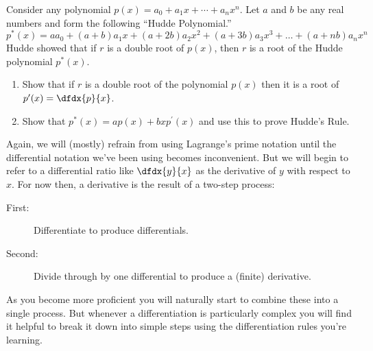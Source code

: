   \begin{embeddedproblem} Consider any polynomial
    $p(x)=a_0+a_1 x+\cdots+a_n x^n$. Let $a$ and $b$ be any real
    numbers and form the following ``Hudde Polynomial.''
    $$
    {p} ^ {*} \left (x \right ) =a {a} _ {0} + \left (a+b \right ) {a} _
    {1} x+ \left (a+2b \right ) {a} _ {2} {x} ^ {2} + \left (a+3b \right
    ) {a} _ {3} {x} ^ {3} +\ldots+ \left (a+nb \right ) {a} _ {n} {x} ^
    {n}
    $$
    Hudde showed that if $r$ is a double root of $p(x)$, then $r$ is a root of the Hudde
    polynomial $p^*(x).$
    \begin{enumerate}[label={\bf{}(\alph*)}]{}
    \item Show that if $r$ is a double root of the polynomial $p(x)$
      then it is a root of $p^\prime(x)=\dfdx{p}{x}$.  
    \item Show that $p^*(x) = ap(x)+bxp^\prime(x)$ and use this to prove
      Hudde's Rule.
    \end{enumerate}
    \vskip-4mm{}
  \end{embeddedproblem}


  Again, we will (mostly) refrain from using Lagrange's prime notation
  until the differential notation we've been using becomes
  inconvenient. But we will begin to refer to a differential ratio
  like $\dfdx{y}{x}$ as the derivative of $y$ with respect to $x$.
  For now then, a derivative is the result of a two-step process:
  \begin{center}
    \begin{minipage}{.85\linewidth}
      \begin{description}
      \item[First:] \alert{Differentiate to produce differentials.}
      \item[Second:] \alert{Divide through by one differential to
          produce a (finite) derivative.}
      \end{description}
    \end{minipage}
  \end{center}
As you become more proficient you will naturally start to combine
these into a single process. But whenever a differentiation is
particularly complex you will find it helpful to break it down into
simple steps using the differentiation rules you're learning.


